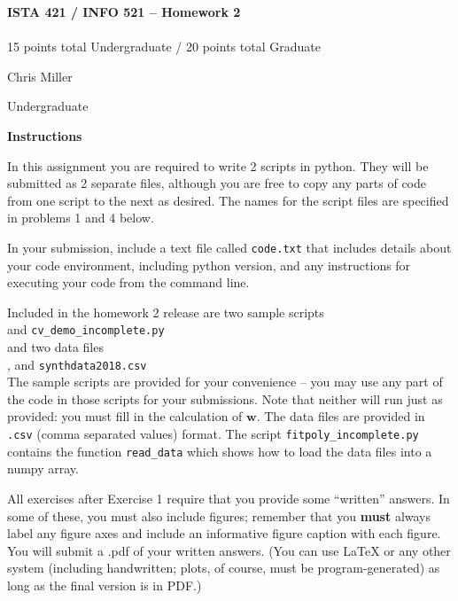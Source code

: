 \documentclass[10pt]{article}
\newcommand{\latex}{\LaTeX\xspace}
\begin{document}
\begin{center}
    {\Large {\bf ISTA 421 / INFO 521 -- Homework 2}} \\
     \\
    15 points total Undergraduate / 20 points total Graduate

\end{center}

\begin{flushright}
Chris Miller %

Undergraduate %
\end{flushright}


\vspace{1cm}
{\Large {\bf Instructions}}

In this assignment you are required to write 2 scripts in python.  They will be submitted as 2 separate files, although you are free to copy any parts of code from one script to the next as desired.  The names for the script files are specified in problems 1 and 4 below.

In your submission, include a text file called {\tt code.txt} that includes details about your code environment, including python version, and any instructions for executing your code from the command line.

Included in the homework 2 release are two sample scripts \\ 
\-\hspace{2cm}{\tt fitpoly\_incomplete.py} and {\tt cv\_demo\_incomplete.py} \\
and two data files\\
\-\hspace{2cm}{\tt womens100.csv}, and {\tt synthdata2018.csv}\\
The sample scripts are provided for your convenience -- you may use any part of the code in those scripts for your submissions.  Note that neither will run just as provided: you must fill in the calculation of $\mathbf{w}$.  The data files are provided in {\tt .csv} (comma separated values) format.  The script {\tt fitpoly\_incomplete.py} contains the function {\tt read\_data} which shows how to load the data files into a numpy array.

All exercises after Exercise 1 require that you provide some ``written'' answers.  In some of these, you must also include figures; remember that you {\bf must} always label any figure axes and include an informative figure caption with each figure.  You will submit a .pdf of your written answers.  (You can use \latex or any other system (including handwritten; plots, of course, must be program-generated) as long as the final version is in PDF.)
\end{document}
